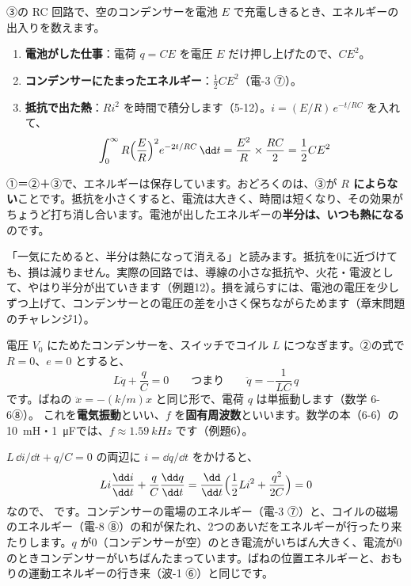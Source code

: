 \label{ph:電-9:sec6}
③の RC 回路で、空のコンデンサーを電池 $E$ で充電しきるとき、エネルギーの出入りを数えます。
\begin{enumerate}[label={\bkcircled{\arabic*}}, leftmargin=2.4\zw, itemsep=2pt, topsep=2pt]
\item \textbf{電池がした仕事}：電荷 $q=CE$ を電圧 $E$ だけ押し上げたので、$CE^2$。
\item \textbf{コンデンサーにたまったエネルギー}：$\tfrac12CE^2$（電-3 ⑦）。
\item \textbf{抵抗で出た熱}：$Ri^2$ を時間で積分します（5-12）。$i=(E/R)\,e^{-t/RC}$ を入れて、
\[ \int_0^\infty R\Bigl(\frac{E}{R}\Bigr)^2e^{-2t/RC}\,\dd t=\frac{E^2}{R}\times\frac{RC}{2}=\frac12CE^2 \]
\end{enumerate}
①＝②＋③で、エネルギーは保存しています。おどろくのは、③が \textbf{$R$ によらない}ことです。抵抗を小さくすると、電流は大きく、時間は短くなり、その効果がちょうど打ち消し合います。電池が出したエネルギーの\textbf{半分は、いつも熱になる}のです。
\begin{phyomi}[$\int Ri^2\,\dd t=\tfrac12CE^2$]
「一気にためると、半分は熱になって消える」と読みます。抵抗を0に近づけても、損は減りません。実際の回路では、導線の小さな抵抗や、火花・電波として、やはり半分が出ていきます（例題12）。損を減らすには、電池の電圧を少しずつ上げて、コンデンサーとの電圧の差を小さく保ちながらためます（章末問題のチャレンジ1）。
\end{phyomi}

\label{ph:電-9:sec7}
電圧 $V_0$ にためたコンデンサーを、スイッチでコイル $L$ につなぎます。②の式で $R=0$、$e=0$ とすると、
\[ L\ddot q+\frac{q}{C}=0\qquad\text{つまり}\qquad \ddot q=-\frac{1}{LC}\,q \]
です。ばねの $\ddot x=-(k/m)x$ と同じ形で、電荷 $q$ は単振動します（数学 6-6⑧）。
\label{ph:電-9:lc}これを\textbf{電気振動}といい、$f$ を\textbf{固有周波数}といいます。数学の本（6-6）の\qty{10}{mH}・\qty{1}{\micro F}では、$f\approx\qty{1.59}{kHz}$ です（例題6）。

$L\,\dd i/\dd t+q/C=0$ の両辺に $i=\dd q/\dd t$ をかけると、
\[ Li\frac{\dd i}{\dd t}+\frac{q}{C}\frac{\dd q}{\dd t}=\frac{\dd}{\dd t}\Bigl(\frac12Li^2+\frac{q^2}{2C}\Bigr)=0 \]
なので、
です。コンデンサーの電場のエネルギー（電-3 ⑦）と、コイルの磁場のエネルギー（電-8 ⑧）の和が保たれ、2つのあいだをエネルギーが行ったり来たりします。$q$ が0（コンデンサーが空）のとき電流がいちばん大きく、電流が0のときコンデンサーがいちばんたまっています。ばねの位置エネルギーと、おもりの運動エネルギーの行き来（波-1 ⑥）と同じです。

